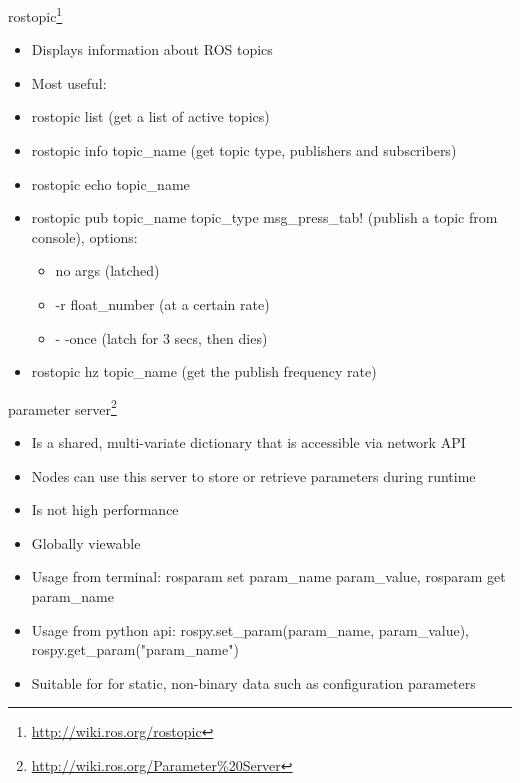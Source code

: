 \documentclass{beamer}
\begin{document}

\begin{frame}{rostopic\footnote{\url{http://wiki.ros.org/rostopic}}}

	\begin{itemize}
		\item Displays information about ROS topics
		\item Most useful:
		\item rostopic list (get a list of active topics)
		\item rostopic info topic\_name (get topic type, publishers and subscribers)
		\item rostopic echo topic\_name
		\item rostopic pub topic\_name topic\_type msg\_press\_tab! (publish a topic from console), options:
		\begin{itemize}
			\item no args (latched)
			\item -r float\_number (at a certain rate)
			\item - -once (latch for 3 secs, then dies)
		\end{itemize}
		\item rostopic hz topic\_name (get the publish frequency rate)
	\end{itemize}

\end{frame}


\begin{frame}{parameter server\footnote{\url{http://wiki.ros.org/Parameter\%20Server}}}
	\begin{itemize}
		\item Is a shared, multi-variate dictionary that is accessible via network API
		\item Nodes can use this server to store or retrieve parameters during runtime
		\item Is not high performance
		\item Globally viewable
		\item Usage from terminal: rosparam set param\_name param\_value, rosparam get param\_name
		\item Usage from python api: rospy.set\_param(param\_name, param\_value), rospy.get\_param("param\_name")
		\item Suitable for for static, non-binary data such as configuration parameters
	\end{itemize}
	
\end{frame}
\end{document}

